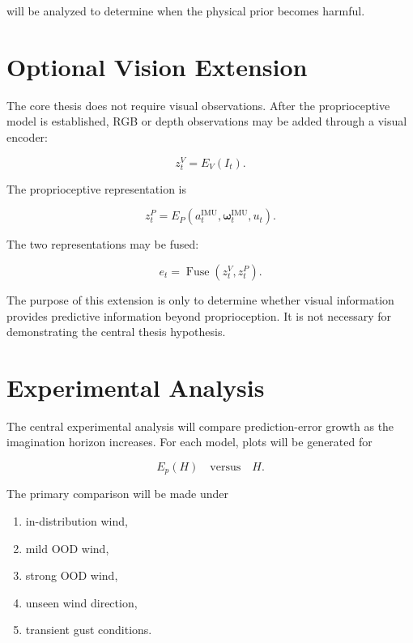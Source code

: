 \documentclass[conference]{IEEEtran}
\begin{document}
will be analyzed to determine when the physical prior becomes harmful.



\section{Optional Vision Extension}


The core thesis does not require visual observations. After the proprioceptive model is established, RGB or depth observations may be added through a visual encoder:

\begin{equation}
z_t^V
=
E_V(I_t).
\end{equation}

The proprioceptive representation is

\begin{equation}
z_t^P
=
E_P
(
a_t^{\mathrm{IMU}},
\boldsymbol{\omega}_t^{\mathrm{IMU}},
u_t
).
\end{equation}

The two representations may be fused:

\begin{equation}
e_t
=
\operatorname{Fuse}
(z_t^V,z_t^P).
\end{equation}

The purpose of this extension is only to determine whether visual information provides predictive information beyond proprioception. It is not necessary for demonstrating the central thesis hypothesis.


\section{Experimental Analysis}


The central experimental analysis will compare prediction-error growth as the imagination horizon increases. For each model, plots will be generated for

\begin{equation}
E_p(H)
\quad\text{versus}\quad
H.
\end{equation}

The primary comparison will be made under

\begin{enumerate}
    \item in-distribution wind,
    \item mild OOD wind,
    \item strong OOD wind,
    \item unseen wind direction,
    \item transient gust conditions.
\end{enumerate}
\end{document}
